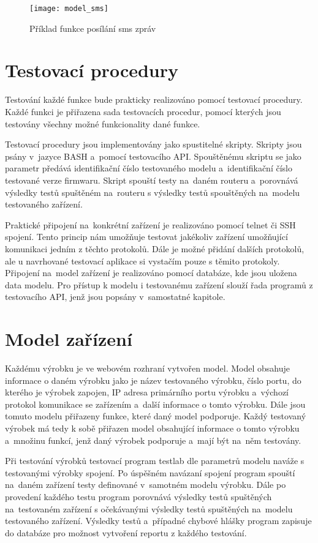 \begin{figure}[h]
  \centering
  \texttt{[image: model\_sms]}
  \caption{Příklad funkce posílání sms zpráv}
  \label{fig:model_sms}
\end{figure}

\section{Testovací procedury}
Testování každé funkce bude prakticky realizováno pomocí testovací procedury. Každé funkci je přiřazena sada testovacích procedur, pomocí kterých jsou testovány všechny možné funkcionality dané funkce.

Testovací procedury jsou implementovány jako spustitelné skripty. Skripty jsou psány v~jazyce BASH a~pomocí testovacího API. Spouštěnému skriptu se jako parametr předává identifikační číslo testovaného modelu a~identifikační číslo testované verze firmwaru. Skript spouští testy na~daném routeru a~porovnává výsledky testů spuštěném na~routeru s výsledky testů spouštěných na~modelu testovaného zařízení.

Praktické připojení na~konkrétní zařízení je realizováno pomocí telnet či SSH spojení. Tento princip nám umožňuje testovat jakékoliv zařízení umožňující komunikaci jedním z těchto protokolů. Dále je možné přidání dalších protokolů, ale u navrhované testovací aplikace si vystačím pouze s těmito protokoly. Připojení na~model zařízení je realizováno pomocí databáze, kde jsou uložena data modelu. Pro přístup k modelu i testovanému zařízení slouží řada programů z testovacího API, jenž jsou popsány v~samostatné kapitole.

\section{Model zařízení}
Každému výrobku je ve webovém rozhraní vytvořen model. Model obsahuje informace o daném výrobku jako je název testovaného výrobku, číslo portu, do kterého je výrobek zapojen, IP adresa primárního portu výrobku a~výchozí protokol komunikace se zařízením a~další informace o tomto výrobku. Dále jsou tomuto modelu přiřazeny funkce, které daný model podporuje. Každý testovaný výrobek má tedy k sobě přiřazen model obsahující informace o tomto výrobku a~množinu funkcí, jenž daný výrobek podporuje a~mají být na~něm testovány.

Při testování výrobků testovací program testlab dle parametrů modelu naváže s testovanými výrobky spojení. Po úspěšném navázaní spojení program spouští na~daném zařízení testy definované v~samotném modelu výrobku. Dále po provedení každého testu program porovnává výsledky testů spuštěných na~testovaném zařízení s očekávanými výsledky testů spuštěných na~modelu testovaného zařízení. Výsledky testů a~případné chybové hlášky program zapisuje do databáze pro možnost vytvoření reportu z každého testování.

